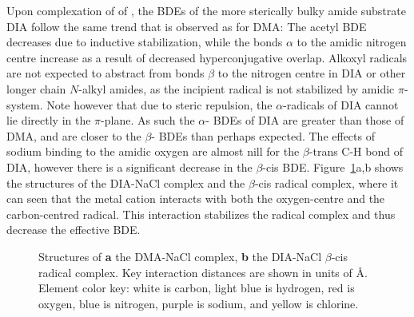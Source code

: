 Upon complexation of  of , the BDEs of the more sterically bulky amide substrate DIA follow the same trend that is observed as for DMA: The acetyl  BDE decreases due to inductive stabilization, while the  bonds $\alpha$ to the amidic nitrogen centre increase as a result of decreased hyperconjugative overlap. Alkoxyl radicals are not expected to abstract from  bonds $\beta$ to the nitrogen centre in DIA or other longer chain $N$-alkyl amides, as the incipient radical is not stabilized by amidic $\pi$-system. Note however that due to steric repulsion, the $\alpha$-radicals of DIA cannot lie directly in the $\pi$-plane. As such the $\alpha$- BDEs of DIA are greater than those of DMA, and are closer to the $\beta$- BDEs than perhaps expected. The effects of sodium binding to the amidic oxygen are almost nill for the $\beta$-trans C-H bond of DIA, however there is a significant decrease in the $\beta$-cis  BDE. Figure~\ref{fig:dia-na-cl}a,b shows the structures of the DIA-NaCl complex and the $\beta$-cis radical complex, where it can seen that the metal cation interacts with both the oxygen-centre and the carbon-centred radical. This interaction stabilizes the radical complex and thus decrease the effective BDE.

\begin{figure}[!htbp]
	\centering


  \caption[Structures of the DIA-NaCl complex and radical complex.]{Structures of \textbf{a} the DMA-NaCl complex, \textbf{b} the DIA-NaCl $\beta$-cis radical complex. Key interaction distances are shown in units of \AA. Element color key: white is carbon, light blue is hydrogen, red is oxygen, blue is nitrogen, purple is sodium, and yellow is chlorine.}
	\label{fig:dia-na-cl}
\end{figure}

